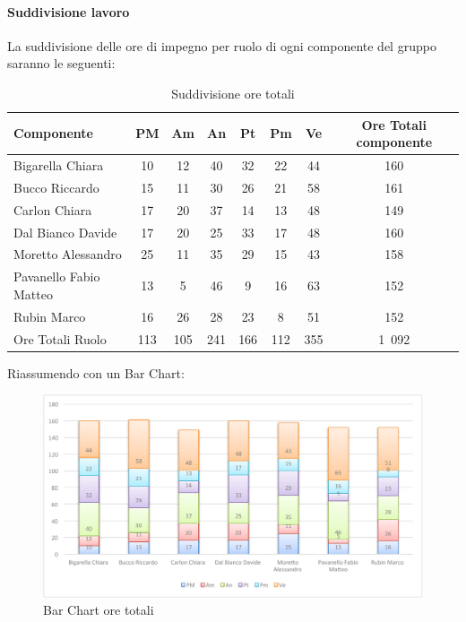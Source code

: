 		\paragraph{Suddivisione lavoro}
				La suddivisione delle ore di impegno per ruolo di ogni componente del gruppo \groupname{} saranno le seguenti:
				\begin{table}[H]
					\begin{center}
						\begin{tabular}{| l | c | c | c | c | c | c | c |}
							\hline
							Componente 					& PM		& Am 		& An 		& Pt 		& Pm 		& Ve 		& Ore Totali componente \\ \hline
							
							Bigarella Chiara 			& 10		& 12 		& 40 		& 32		& 22		& 44 		& 160 \\
							Bucco Riccardo 				& 15		& 11 		& 30 		& 26		& 21		& 58 		& 161 \\
							Carlon Chiara	 			& 17 		& 20 		& 37 		& 14		& 13		& 48 		& 149 \\
							Dal Bianco Davide 			& 17		& 20 		& 25 		& 33		& 17		& 48 		& 160 \\
							Moretto Alessandro 			& 25 		& 11		& 35 		& 29		& 15		& 43 		& 158 \\
							Pavanello Fabio Matteo	 	& 13		& 5 		& 46 		& 9			& 16		& 63 		& 152 \\
							Rubin Marco					& 16 		& 26 		& 28 		& 23		& 8			& 51 		& 152 \\ \hline \hline
							
							Ore Totali Ruolo 			& 113 	& 105	& 241 	& 166	& 112		& 355 	& 1~092 \\ \hline
						\end{tabular}
					\end{center}
					\caption{Suddivisione ore totali}
				\end{table}
				Riassumendo con un Bar Chart:
				\begin{figure}[H]\centering
					\includegraphics[width=\textwidth]{PianoDiProgetto/Pics/ChartOreTot.pdf}
					\caption{Bar Chart ore totali}
				\end{figure}

